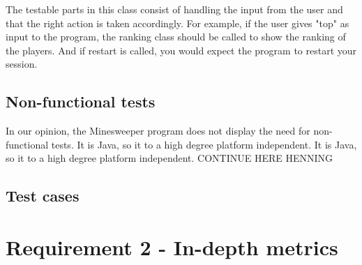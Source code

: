 \documentclass[UKenglish]{article}  %
\begin{document}
The testable parts in this class consist of handling the input from the user and that the right action is taken
accordingly. For example, if the user gives "top" as input to the program, the ranking class should be called to show
the ranking of the players. And if restart is called, you would expect the program to restart your session.

\subsection{Non-functional tests}
In our opinion, the Minesweeper program does not display the need for non-functional tests. It is Java, so it to a high
degree platform independent. It is Java, so it to a high degree platform independent. CONTINUE HERE HENNING

\subsection{Test cases}

\section{Requirement 2 - In-depth metrics}
\end{document}
